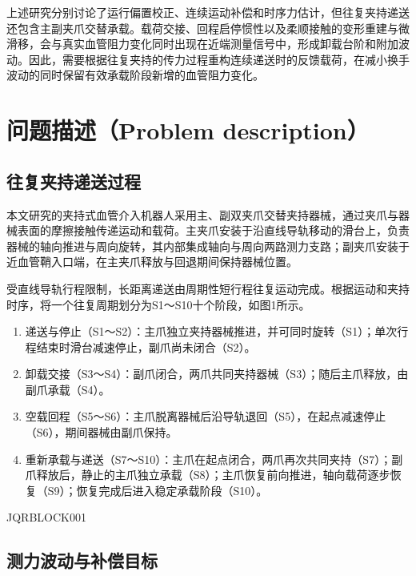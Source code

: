 上述研究分别讨论了运行偏置校正、连续运动补偿和时序力估计，但往复夹持递送还包含主副夹爪交替承载。载荷交接、回程启停惯性以及柔顺接触的变形重建与微滑移，会与真实血管阻力变化同时出现在近端测量信号中，形成卸载台阶和附加波动。因此，需要根据往复夹持的传力过程重构连续递送时的反馈载荷，在减小换手波动的同时保留有效承载阶段新增的血管阻力变化。

\section{问题描述（Problem description）}

\subsection{往复夹持递送过程}


本文研究的夹持式血管介入机器人采用主、副双夹爪交替夹持器械，通过夹爪与器械表面的摩擦接触传递运动和载荷。主夹爪安装于沿直线导轨移动的滑台上，负责器械的轴向推进与周向旋转，其内部集成轴向与周向两路测力支路；副夹爪安装于近血管鞘入口端，在主夹爪释放与回退期间保持器械位置。





受直线导轨行程限制，长距离递送由周期性短行程往复运动完成。根据运动和夹持时序，将一个往复周期划分为S1～S10十个阶段，如图1所示。
\begin{enumerate}
\item 递送与停止（S1～S2）：主爪独立夹持器械推进，并可同时旋转（S1）；单次行程结束时滑台减速停止，副爪尚未闭合（S2）。
\item 卸载交接（S3～S4）：副爪闭合，两爪共同夹持器械（S3）；随后主爪释放，由副爪承载（S4）。
\item 空载回程（S5～S6）：主爪脱离器械后沿导轨退回（S5），在起点减速停止（S6），期间器械由副爪保持。
\item 重新承载与递送（S7～S10）：主爪在起点闭合，两爪再次共同夹持（S7）；副爪释放后，静止的主爪独立承载（S8）；主爪恢复前向推进，轴向载荷逐步恢复（S9）；恢复完成后进入稳定承载阶段（S10）。
\end{enumerate}







JQRBLOCK001






\subsection{测力波动与补偿目标}


